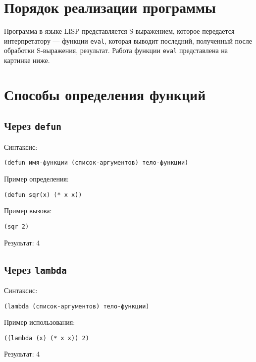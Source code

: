 \section{Порядок реализации программы}

Программа в языке LISP представляется S-выражением, которое передается интерпретатору --- функции \texttt{eval}, которая выводит последний, полученный после обработки S-выражения, результат.
Работа функции \texttt{eval} представлена на картинке ниже.


\section{Способы определения функций}

\subsection{Через \texttt{defun}}

Синтаксис:
\begin{lstlisting}
(defun имя-функции (список-аргументов) тело-функции)
\end{lstlisting}

Пример определения:
\begin{lstlisting}
(defun sqr(x) (* x x))
\end{lstlisting}

Пример вызова:
\begin{lstlisting}
(sqr 2)
\end{lstlisting}
Результат: 4

\subsection{Через \texttt{lambda}}

Синтаксис:
\begin{lstlisting}
(lambda (список-аргументов) тело-функции)
\end{lstlisting}

Пример использования:
\begin{lstlisting}
((lambda (x) (* x x)) 2)
\end{lstlisting}
Результат: 4
